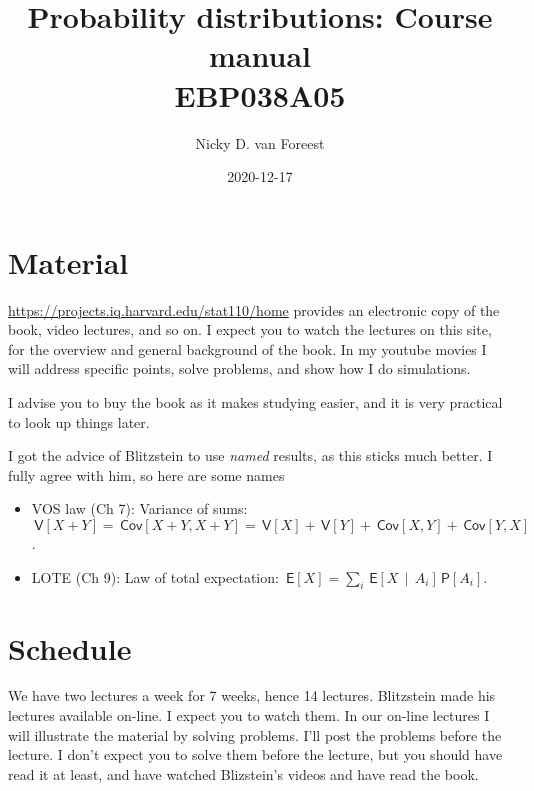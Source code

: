 \documentclass[a4paper]{article}
\author{Nicky D. van Foreest}
\date{2020-12-17}
\title{Probability distributions: Course manual\\\medskip
\large EBP038A05}
\theoremstyle{definition}
\newcommand{\given}{\,\middle|\,}
\renewcommand{\P}[1]{\,\mathsf{P}\left[#1\right]}
\newcommand{\E}[1]{\,\mathsf{E}\left[#1\right]}
\newcommand{\V}[1]{\,\mathsf{V}\left[#1\right]}
\newcommand{\cov}[1]{\,\mathsf{Cov}\left[#1\right]}
\newcommand{\1}[1]{\,I_{#1}} %
\begin{document}
\maketitle
\tableofcontents


\section{Material}
\label{sec:org049b67b}

\url{https://projects.iq.harvard.edu/stat110/home} provides an electronic copy of the book, video lectures, and so on.  I expect you to watch the lectures on this site, for the overview and general background of the book. In my youtube movies I will address specific points, solve problems, and show how I do simulations. 

I advise you to buy the book as it makes studying easier, and it is very practical to look up things later.

I got the advice of  Blitzstein to use \emph{named} results, as this sticks much better. I fully agree with him, so here are some names 
\begin{itemize}
\item VOS law (Ch 7): Variance of sums: \(\V{X+Y}= \cov{X+Y, X+Y} = \V X + \V Y + \cov{X,Y} + \cov{Y, X}\).
\item LOTE  (Ch 9):  Law of total expectation: \(\E{X} = \sum_{i} \E{X \given A_i} \P{A_i}\).
\end{itemize}


\section{Schedule}
\label{sec:orgf043eec}

We have two lectures a week for 7 weeks, hence 14 lectures.
Blitzstein made his lectures available on-line.
I expect you to watch them.
In our on-line lectures I will illustrate the material by solving problems.
I'll post the problems before the lecture.
I don't expect you to solve them before the lecture, but you should have read it at least, and have watched Blizstein's videos and have read the book.
\end{document}
